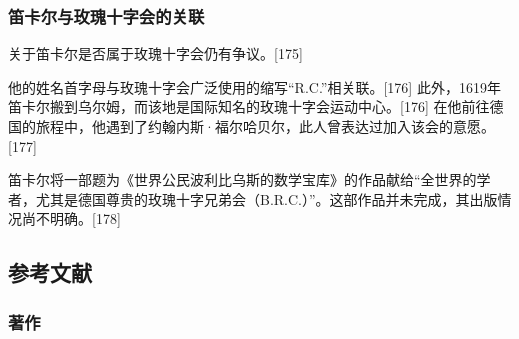 \subsubsection{笛卡尔与玫瑰十字会的关联}
关于笛卡尔是否属于玫瑰十字会仍有争议。[175]

他的姓名首字母与玫瑰十字会广泛使用的缩写“R.C.”相关联。[176] 此外，1619年笛卡尔搬到乌尔姆，而该地是国际知名的玫瑰十字会运动中心。[176] 在他前往德国的旅程中，他遇到了约翰内斯·福尔哈贝尔，此人曾表达过加入该会的意愿。[177]

笛卡尔将一部题为《世界公民波利比乌斯的数学宝库》的作品献给“全世界的学者，尤其是德国尊贵的玫瑰十字兄弟会（B.R.C.）”。这部作品并未完成，其出版情况尚不明确。[178]
\subsection{参考文献}
\subsubsection{著作}

